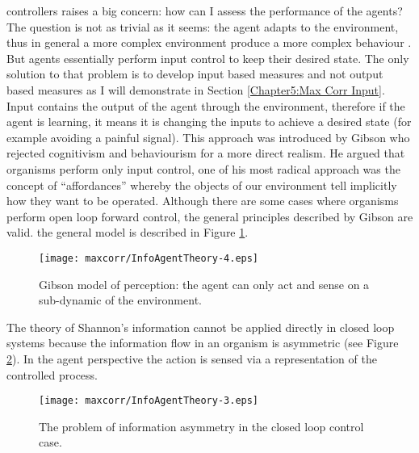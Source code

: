 controllers raises a big concern: how can I assess the performance of the agents?
The question is not as trivial as it seems: the agent adapts to the environment,
thus in general a more complex environment produce a more complex
behaviour \citep{NolfiInteraction}. 
But agents essentially perform input control to keep their desired state.
The only solution to that problem is to develop input based measures and not 
output based measures as I will demonstrate in Section \ref{Chapter5:Max Corr Input}.
Input contains the output of the agent through the environment,
therefore if the agent is learning, it means it is changing the inputs to achieve
a desired state (for example avoiding a painful signal).
This approach was introduced by Gibson \citep{Gibson1955:learning} who rejected
cognitivism and behaviourism for a more direct realism. 
He argued that organisms perform only input control, one of his most radical
 approach was the concept of ``affordances'' whereby the objects of our environment
 tell implicitly how they want to be operated.
Although there are some cases where organisms perform open loop forward control,
 the general principles described by Gibson are valid.
the general model is described in Figure \ref{Figure:maxcorr:Gibson}.

\begin{figure}[ht]
  \begin{center}
    \texttt{[image: maxcorr/InfoAgentTheory-4.eps]}
    \caption[Gibson cybernetic approach]{
	     Gibson model of perception: the agent can only act and sense
	     on a sub-dynamic of the environment.
	     \label{Figure:maxcorr:Gibson}}
  \end{center}
\end{figure}

The theory of Shannon's information cannot be applied directly in closed loop
 systems because the information flow in an organism is asymmetric
(see Figure \ref{Figure:maxcorr:asymmetry}).
In the agent perspective the action is sensed via a representation of the
controlled process.

\begin{figure}[ht]
  \begin{center}
    \texttt{[image: maxcorr/InfoAgentTheory-3.eps]}
    \caption[Information asymmetry in the organism]{
	     The problem of information asymmetry in the closed loop control case.
	      \label{Figure:maxcorr:asymmetry}}
  \end{center}
\end{figure}

